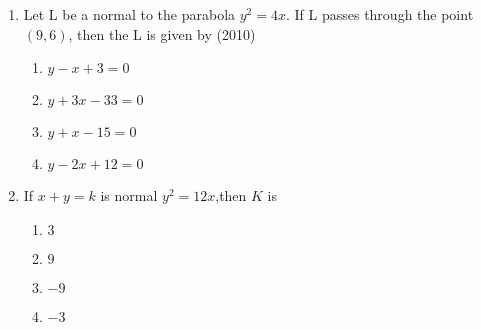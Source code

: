 \begin{enumerate}
	\item Let L be a normal to the parabola $y^2=4x$. If L passes through the point $(9,6)$, then the L is given by 
		\hfill(2010)
		
		 \begin{multicols}{2}
\begin{enumerate}
			\item $y-x+3=0$
			\item $y+3x-33=0$
			\item $y+x-15=0$
			\item $y-2x+12=0$
		 \end{enumerate}
\end{multicols}

\item If $x+y=k$ is normal $y^2=12x$,then $K$ is
     \hfill{}
\begin{multicols}{2}
\begin{enumerate}
    \item $3$
    \item $9$
    \item $-9$
    \item $-3$
\end{enumerate}
\end{multicols}
\end{enumerate}
